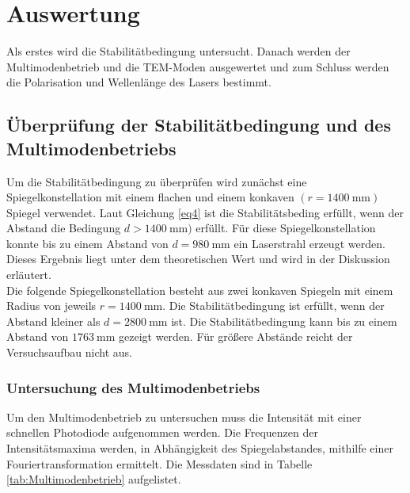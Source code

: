 \section{Auswertung}
\label{sec:Auswertung}

Als erstes wird die Stabilitätbedingung untersucht. Danach werden der 
Multimodenbetrieb und die TEM-Moden ausgewertet und zum Schluss werden 
die Polarisation und Wellenlänge des Lasers bestimmt.

\subsection{Überprüfung der Stabilitätbedingung und des Multimodenbetriebs}

Um die Stabilitätbedingung zu überprüfen wird zunächst eine Spiegelkonstellation mit einem flachen 
und einem konkaven $(r=\SI{1400}{\milli\meter})$ Spiegel verwendet. Laut Gleichung \eqref{eq4} ist die 
Stabilitätsbeding erfüllt, wenn der Abstand die Bedingung $d>\SI{1400}{\milli\meter})$ erfüllt.
Für diese Spiegelkonstellation konnte bis zu einem Abstand von $d=\SI{980}{\milli\meter}$ ein Laserstrahl erzeugt werden.
Dieses Ergebnis liegt unter dem theoretischen Wert und wird in der Diskussion erläutert.\\
Die folgende Spiegelkonstellation besteht aus zwei konkaven Spiegeln mit einem Radius von jeweils $r=\SI{1400}{\milli\meter}$.
Die Stabilitätbedingung ist erfüllt, wenn der Abstand kleiner als $d = \SI{2800}{\milli\meter}$ ist. 
Die Stabilitätbedingung kann bis zu einem Abstand von $\SI{1763}{\milli\meter}$ gezeigt werden. Für größere 
Abstände reicht der Versuchsaufbau nicht aus.

\subsubsection{Untersuchung des Multimodenbetriebs}

Um den Multimodenbetrieb zu untersuchen muss die Intensität mit einer schnellen Photodiode aufgenommen werden. Die 
Frequenzen der Intensitätsmaxima werden, in Abhängigkeit des Spiegelabstandes, mithilfe einer Fouriertransformation ermittelt. 
Die Messdaten sind in Tabelle \ref{tab:Multimodenbetrieb} aufgelistet.

